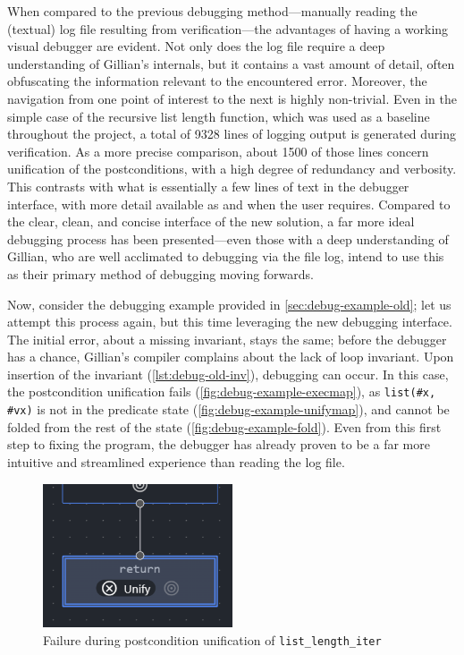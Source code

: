 When compared to the previous debugging method---manually reading the (textual)
log file resulting from verification---the advantages of having a working visual
debugger are evident. Not only does the log file require a deep understanding of
Gillian's internals, but it contains a vast amount of detail, often obfuscating
the information relevant to the encountered error. Moreover, the navigation from
one point of interest to the next is highly non-trivial. Even in the simple case
of the recursive list length function, which was used as a baseline throughout
the project, a total of 9328 lines of logging output is generated during
verification. As a more precise comparison, about 1500 of those lines concern
unification of the postconditions, with a high degree of redundancy and
verbosity. This contrasts with what is essentially a few lines of text in the
debugger interface, with more detail available as and when the user requires.
Compared to the clear, clean, and concise interface of the new solution, a far
more ideal debugging process has been presented---even those with a deep
understanding of Gillian, who are well acclimated to debugging via the file log,
intend to use this as their primary method of debugging moving forwards.

Now, consider the debugging example provided in \autoref{sec:debug-example-old};
let us attempt this process again, but this time leveraging the new debugging
interface. The initial error, about a missing invariant, stays the same; before
the debugger has a chance, Gillian's compiler complains about the lack of loop
invariant. Upon insertion of the invariant (\autoref{lst:debug-old-inv}),
debugging can occur. In this case, the postcondition unification fails
(\autoref{fig:debug-example-execmap}), as \texttt{list(\#x, \#vx)} is not in the
predicate state (\autoref{fig:debug-example-unifymap}), and cannot be folded
from the rest of the state (\autoref{fig:debug-example-fold}). Even from this
first step to fixing the program, the debugger has already proven to be a far
more intuitive and streamlined experience than reading the log file.

\begin{figure}
  \centering
  \includegraphics[width=0.5\textwidth]{img/debug-example-execmap.png}
  \caption{
    Failure during postcondition unification of \texttt{list\_length\_iter}
  }\label{fig:debug-example-execmap}
\end{figure}

